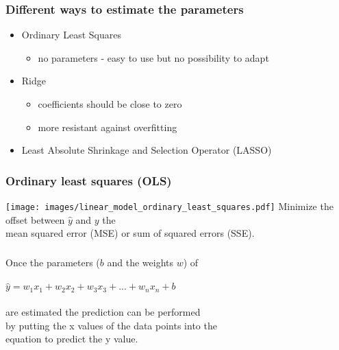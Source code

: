 \documentclass[aspectratio=169]{beamer}
\begin{document}
\begin{frame}
  \frametitle{Different ways to estimate the parameters}
  \begin{block}{}
    \begin{center}
      \begin{itemize}
      \item Ordinary Least Squares
        \begin{itemize}
        \item no parameters - easy to use but no possibility to adapt
        \end{itemize}
      \item Ridge
        \begin{itemize}
        \item coefficients should be close to zero
        \item more resistant against overfitting
        \end{itemize}    
      \item Least Absolute Shrinkage and Selection Operator (LASSO)
      \end{itemize}
    \end{center}
  \end{block}
\end{frame}

\begin{frame}
  \frametitle{Ordinary least squares (OLS)}
  \begin{center}
    \texttt{[image: images/linear\_model\_ordinary\_least\_squares.pdf]}
    Minimize the offset between $\hat{y}$ and $y$ the\\
    mean squared error (MSE) or sum of squared errors (SSE).
  \end{center}
\end{frame}


\begin{frame}
  \frametitle{}
  \begin{block}{}
    \begin{center}
      Once the parameters ($b$ and the weights $w$) of\\
      \ \\
      $\hat{y} = w_{1}x_{1} + w_{2}x_{2} + w_{3}x_{3} + ... + w_{n}x_{n} + b$\\
      \ \\
      are estimated the prediction can be performed\\
      by putting the x values of the data points into the\\
      equation to predict the y value.
    \end{center}
  \end{block}
\end{frame}
\end{document}
